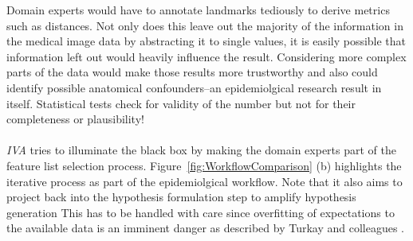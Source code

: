 \documentclass[journal]{style/vgtc} 			          %
\begin{document}
%
Domain experts would have to annotate landmarks tediously to derive metrics such as distances. %
%
Not only does this leave out the majority of the information in the medical image data by abstracting it to single values, it is easily possible that information left out would heavily influence the result.
%
Considering more complex parts of the data would make those results more trustworthy and also could identify possible anatomical confounders--an epidemiolgical research result in itself.
%
Statistical tests check for validity of the number but not for their completeness or plausibility!
\\\\
\emph{IVA} tries to illuminate the black box by making the domain experts part of the feature list selection process.
%
Figure~\ref{fig:WorkflowComparison} (b) highlights the iterative process as part of the epidemiolgical workflow.
%
Note that it also aims to project back into the hypothesis formulation step to amplify hypothesis generation 
%
This has to be handled with care since overfitting of expectations to the available data is an imminent danger as described by Turkay and colleagues \cite{Turkay2013}.
\end{document}
